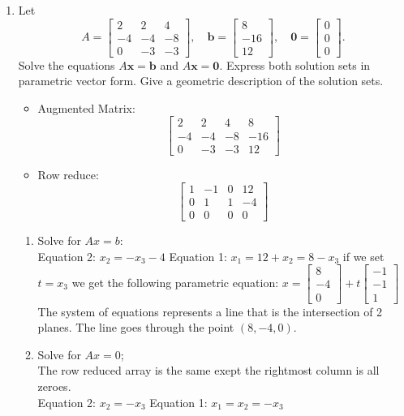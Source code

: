 \documentclass[12pt,a4paper]{exam}
\newcommand{\bb}{\mathbf{b}}
\newcommand{\bx}{\mathbf{x}}
\begin{document}
\begin{enumerate}
\item \cite[cf. Section 1.5, Ex 17]{La-LA}
Let 
\[ 
A=\left[\begin{matrix} 2 & 2 & 4 \\ -4 & -4 & -8 \\ 0 & -3 & -3 
\end{matrix}\right], \quad 
\bb=\left[\begin{matrix} 8 \\ -16 \\ 12 \end{matrix}\right], \quad
\mathbf{0}=\left[\begin{matrix} 0 \\ 0 \\ 0 \end{matrix}\right]. 
\]
Solve the equations $A\bx=\bb$ and  $A\bx=\mathbf{0}$. Express both solution sets in parametric vector form.
Give a geometric description of the solution sets.

\begin{solution}
  \begin{itemize}
    \item Augmented Matrix:\\
      \[
        \left[\begin{array}{cccc} 2 & 2 & 4 & 8 \\ -4 & -4 & -8 & -16 \\ 0 & -3 & -3 & 12
        \end{array}\right]
      \]
    \item Row reduce:\\
      \[
        \left[\begin{array}{cccc} 1 & -1 & 0 & 12 \\ 0 & 1 & 1 & -4 \\ 0 & 0 & 0 & 0
        \end{array}\right]
      \]
  \end{itemize}
  \begin{enumerate}
    \item Solve for $Ax=b$:\\
      Equation 2: $x_2=-x_3-4$ 
      Equation 1: $x_1=12+x_2=8-x_3$
      if we set $t=x_3$ we get the following parametric equation: 
      $x=\left[\begin{array}{c} 8 \\ -4 \\ 0 \end{array}\right] + t\left[\begin{array}{c} -1 \\ -1 \\ 1 \end{array}\right]$\\
      The system of equations represents a line that is the intersection of 2 planes. The line goes through the point $(8,-4,0)$.
    \item Solve for $Ax=0$;\\
      The row reduced array is the same exept the rightmost column is all zeroes.\\
      Equation 2: $x_2=-x_3$ 
      Equation 1: $x_1=x_2=-x_3$



\end{enumerate}
\end{solution}
\end{enumerate}
\end{document}

